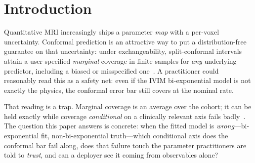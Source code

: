 \documentclass[11pt]{article}
\begin{document}
\section{Introduction}
Quantitative MRI increasingly ships a parameter \emph{map} with a per-voxel
uncertainty. Conformal prediction is an attractive way to put a distribution-free
guarantee on that uncertainty: under exchangeability, split-conformal intervals
attain a user-specified \emph{marginal} coverage in finite samples for \emph{any}
underlying predictor, including a biased or misspecified one~\citep{vovk2005,lei2018}.
A practitioner could reasonably read this as a safety net: even if the IVIM
bi-exponential model is not exactly the physics, the conformal error bar still
covers at the nominal rate.

That reading is a trap. Marginal coverage is an average over the cohort; it can be
held exactly while coverage \emph{conditional} on a clinically relevant axis fails
badly~\citep{barber2021}. The question this paper answers is concrete: when the
fitted model is \emph{wrong}---bi-exponential fit, non-bi-exponential truth---which
conditional axis does the conformal bar fail along, does that failure touch the
parameter practitioners are told to \emph{trust}, and can a deployer see it coming
from observables alone?
\end{document}
